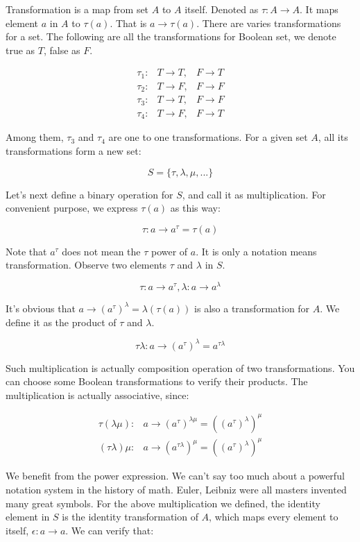 \documentclass[b5paper]{article}
\begin{document}
Transformation is a map from set $A$ to $A$ itself. Denoted as $\tau : A \to A$. It maps element $a$ in $A$ to $\tau(a)$. That is $a \to \tau(a)$. There are varies transformations for a set. The following are all the transformations for Boolean set, we denote true as $T$, false as $F$.

\[
\begin{array}{rll}
\tau_1 : & T \to T, & F \to T \\
\tau_2 : & T \to F, & F \to F \\
\tau_3 : & T \to T, & F \to F \\
\tau_4 : & T \to F, & F \to T
\end{array}
\]

Among them, $\tau_3$ and $\tau_4$ are one to one transformations. For a given set $A$, all its transformations form a new set:

\[
S = \{\tau, \lambda, \mu, ...\}
\]

Let's next define a binary operation for $S$, and call it as multiplication. For convenient purpose, we express $\tau(a)$ as this way:

\[
\tau: a \to a^\tau = \tau(a)
\]

Note that $a^\tau$ does not mean the $\tau$ power of $a$. It is only a notation means transformation. Observe two elements $\tau$ and $\lambda$ in $S$.

\[
\tau: a \to a^\tau,  \lambda: a \to a^\lambda
\]

It's obvious that $a \to (a^\tau)^\lambda = \lambda(\tau(a))$ is also a transformation for $A$. We define it as the product of $\tau$ and $\lambda$.

\[
\tau\lambda: a \to (a^\tau)^\lambda = a^{\tau\lambda}
\]

Such multiplication is actually composition operation of two transformations. You can choose some Boolean transformations to verify their products. The multiplication is actually associative, since:

\[
\begin{array}{rl}
\tau(\lambda\mu): & a \to (a^\tau)^{\lambda\mu} = ((a^\tau)^\lambda)^\mu \\
(\tau\lambda)\mu: & a \to (a^{\tau\lambda})^\mu = ((a^\tau)^\lambda)^\mu
\end{array}
\]

We benefit from the power expression. We can't say too much about a powerful notation system in the history of math. Euler, Leibniz were all masters invented many great symbols. For the above multiplication we defined, the identity element in $S$ is the identity transformation of $A$, which maps every element to itself, $\epsilon: a \to a$. We can verify that:
\end{document}
